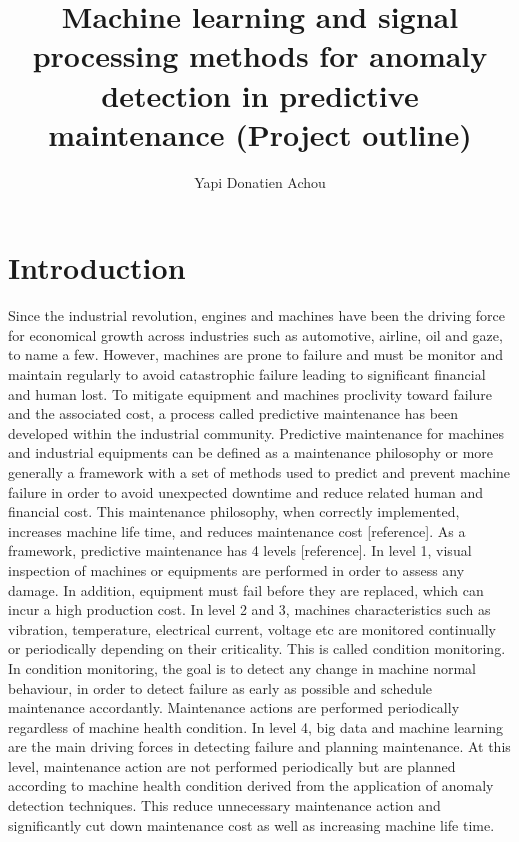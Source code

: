 \documentclass[11pt, oneside]{article}   	%
\title{Machine learning and signal processing methods for anomaly detection in predictive maintenance (Project outline)}
\author{Yapi Donatien Achou}
\begin{document}
\maketitle
\tableofcontents
\newpage
\section{Introduction}
Since the industrial revolution, engines and machines have been the driving force for economical growth across industries such as automotive, airline, oil and gaze, to name a few. However, machines are prone to failure and must be monitor and maintain regularly to avoid catastrophic failure leading to significant financial and human lost. To mitigate equipment and machines proclivity toward failure and the associated cost, a process called predictive maintenance has been developed within the industrial community. Predictive maintenance  for machines and industrial equipments can be defined as a maintenance philosophy or more generally a framework with a set of methods used to predict and prevent machine failure in order to avoid unexpected downtime and reduce related human and financial cost. This maintenance philosophy, when correctly implemented, increases machine life time, and reduces maintenance cost [reference].
\justify
As a framework, predictive maintenance has 4 levels [reference]. In level 1, visual inspection of machines or equipments are performed in order to assess any damage.
In addition, equipment must fail before they are replaced, which can incur a high production cost. In level 2 and 3, machines characteristics such as vibration, temperature, electrical current, voltage etc are monitored continually or periodically depending on their criticality. This is called condition monitoring. In condition monitoring, the goal is to detect any change in machine normal behaviour, in order to detect failure as early as possible and schedule maintenance accordantly. Maintenance actions are performed periodically regardless of machine health condition. In level 4, big data and machine learning are the main driving forces in detecting failure and planning maintenance. At this level, maintenance action are not performed periodically but are planned according to machine health condition derived from the application of anomaly detection techniques. This reduce unnecessary maintenance action and significantly cut down maintenance cost as well as increasing machine life time.
\end{document}
